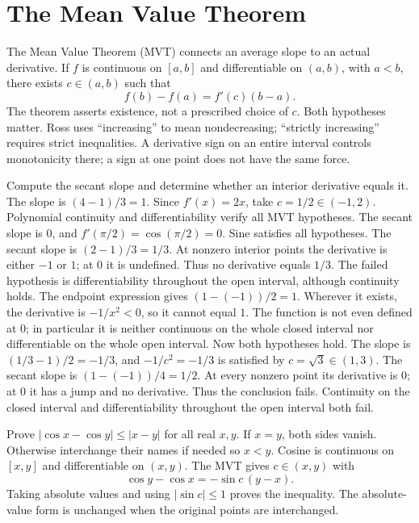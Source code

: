 \section{The Mean Value Theorem}
The Mean Value Theorem (MVT) connects an average slope to an actual derivative. If $f$ is continuous on $[a,b]$ and differentiable on $(a,b)$, with $a<b$, there exists $c\in(a,b)$ such that
\[
 f(b)-f(a)=f'(c)(b-a).
\]
The theorem asserts existence, not a prescribed choice of $c$. Both hypotheses matter. Ross uses ``increasing'' to mean nondecreasing; ``strictly increasing'' requires strict inequalities. A derivative sign on an entire interval controls monotonicity there; a sign at one point does not have the same force.

\goal Compute the secant slope and determine whether an interior derivative equals it.
The slope is $(4-1)/3=1$. Since $f'(x)=2x$, take $c=1/2\in(-1,2)$. Polynomial continuity and differentiability verify all MVT hypotheses.
The secant slope is $0$, and $f'(\pi/2)=\cos(\pi/2)=0$. Sine satisfies all hypotheses.
The secant slope is $(2-1)/3=1/3$. At nonzero interior points the derivative is either $-1$ or $1$; at $0$ it is undefined. Thus no derivative equals $1/3$. The failed hypothesis is differentiability throughout the open interval, although continuity holds.
The endpoint expression gives $(1-(-1))/2=1$. Wherever it exists, the derivative is $-1/x^2<0$, so it cannot equal $1$. The function is not even defined at $0$; in particular it is neither continuous on the whole closed interval nor differentiable on the whole open interval.
Now both hypotheses hold. The slope is $(1/3-1)/2=-1/3$, and $-1/c^2=-1/3$ is satisfied by $c=\sqrt3\in(1,3)$.
The secant slope is $(1-(-1))/4=1/2$. At every nonzero point its derivative is $0$; at $0$ it has a jump and no derivative. Thus the conclusion fails. Continuity on the closed interval and differentiability throughout the open interval both fail.

\goal Prove $|\cos x-\cos y|\le |x-y|$ for all real $x,y$.
If $x=y$, both sides vanish. Otherwise interchange their names if needed so $x<y$. Cosine is continuous on $[x,y]$ and differentiable on $(x,y)$. The MVT gives $c\in(x,y)$ with
\[
 \cos y-\cos x=-\sin c\,(y-x).
\]
Taking absolute values and using $|\sin c|\le1$ proves the inequality. The absolute-value form is unchanged when the original points are interchanged.

